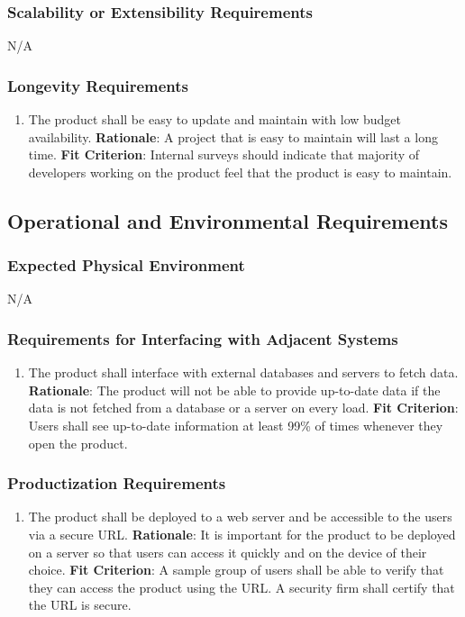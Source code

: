 \documentclass[12pt, titlepage]{article}
\begin{document}
\subsubsection{Scalability or Extensibility Requirements}
N/A

\subsubsection{Longevity Requirements}
\begin{enumerate}[nfr]
    \item The product shall be easy to update and maintain with low budget availability. 
    \newline \textbf{Rationale}: A project that is easy to maintain will last a long time.
    \newline \textbf{Fit Criterion}: Internal surveys should indicate that majority of developers working on the product feel that the product is easy to maintain.
\end{enumerate}

\subsection{Operational and Environmental Requirements}
\subsubsection{Expected Physical Environment}
N/A

\subsubsection{Requirements for Interfacing with Adjacent Systems}
\begin{enumerate}[nfr]
    \item The product shall interface with external databases and servers to fetch data.
    \newline \textbf{Rationale}: The product will not be able to provide up-to-date data if the data is not fetched from a database or a server on every load.
    \newline \textbf{Fit Criterion}: Users shall see up-to-date information at least 99\% of times whenever they open the product.
\end{enumerate}

\subsubsection{Productization Requirements}
\begin{enumerate}[nfr]
    \item The product shall be deployed to a web server and be accessible to the users via a secure URL.
    \newline \textbf{Rationale}: It is important for the product to be deployed on a server so that users can access it quickly and on the device of their choice.
    \newline \textbf{Fit Criterion}: A sample group of users shall be able to verify that they can access the product using the URL. A security firm shall certify that the URL is secure.
\end{enumerate}
\end{document}
